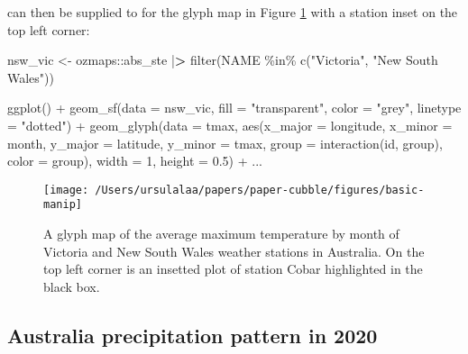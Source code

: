 \documentclass{article}
\newenvironment{Shaded}{\begin{snugshade}}{\end{snugshade}}
\newcommand{\AttributeTok}[1]{\textcolor[rgb]{0.77,0.63,0.00}{#1}}
\newcommand{\DecValTok}[1]{\textcolor[rgb]{0.00,0.00,0.81}{#1}}
\newcommand{\ErrorTok}[1]{\textcolor[rgb]{0.64,0.00,0.00}{\textbf{#1}}}
\newcommand{\FloatTok}[1]{\textcolor[rgb]{0.00,0.00,0.81}{#1}}
\newcommand{\FunctionTok}[1]{\textcolor[rgb]{0.00,0.00,0.00}{#1}}
\newcommand{\NormalTok}[1]{#1}
\newcommand{\OtherTok}[1]{\textcolor[rgb]{0.56,0.35,0.01}{#1}}
\newcommand{\SpecialCharTok}[1]{\textcolor[rgb]{0.00,0.00,0.00}{#1}}
\newcommand{\StringTok}[1]{\textcolor[rgb]{0.31,0.60,0.02}{#1}}
\begin{document}
 can then be supplied to  for the glyph map in Figure \ref{fig:basic-manip} with a station inset on the top left corner:

\begin{Shaded}
\begin{Highlighting}[]
\NormalTok{nsw\_vic }\OtherTok{\textless{}{-}}\NormalTok{ ozmaps}\SpecialCharTok{::}\NormalTok{abs\_ste }\SpecialCharTok{|}\ErrorTok{\textgreater{}} 
  \FunctionTok{filter}\NormalTok{(NAME }\SpecialCharTok{\%in\%} \FunctionTok{c}\NormalTok{(}\StringTok{"Victoria"}\NormalTok{, }\StringTok{"New South Wales"}\NormalTok{))}

\FunctionTok{ggplot}\NormalTok{() }\SpecialCharTok{+} 
  \FunctionTok{geom\_sf}\NormalTok{(}\AttributeTok{data =}\NormalTok{ nsw\_vic, }
          \AttributeTok{fill =} \StringTok{"transparent"}\NormalTok{, }\AttributeTok{color =} \StringTok{"grey"}\NormalTok{, }\AttributeTok{linetype =} \StringTok{"dotted"}\NormalTok{) }\SpecialCharTok{+} 
  \FunctionTok{geom\_glyph}\NormalTok{(}\AttributeTok{data =}\NormalTok{ tmax, }
             \FunctionTok{aes}\NormalTok{(}\AttributeTok{x\_major =}\NormalTok{ longitude, }\AttributeTok{x\_minor =}\NormalTok{ month, }
                 \AttributeTok{y\_major =}\NormalTok{ latitude, }\AttributeTok{y\_minor =}\NormalTok{ tmax,}
                 \AttributeTok{group =} \FunctionTok{interaction}\NormalTok{(id, group), }\AttributeTok{color =}\NormalTok{ group),}
             \AttributeTok{width =} \DecValTok{1}\NormalTok{, }\AttributeTok{height =} \FloatTok{0.5}\NormalTok{) }\SpecialCharTok{+}
\NormalTok{  ...}
\end{Highlighting}
\end{Shaded}

\begin{figure}
\texttt{[image: /Users/ursulalaa/papers/paper-cubble/figures/basic-manip]} \caption{A glyph map of the average maximum temperature by month of Victoria and New South Wales weather stations in Australia. On the top left corner is an insetted plot of station Cobar highlighted in the black box.}\label{fig:basic-manip}
\end{figure}

\hypertarget{australia-precipitation-pattern-in-2020}{%
\subsection{Australia precipitation pattern in 2020}\label{australia-precipitation-pattern-in-2020}}
\end{document}
